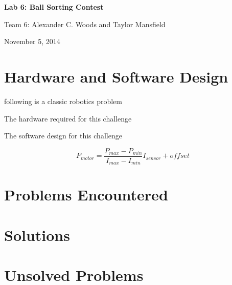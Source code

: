 \documentclass[journal]{../IEEEtran}
\begin{document}
\begin{titlepage}
    \vspace*{\fill}
    \begin{center}
      {\LARGE \bf Lab 6: Ball Sorting Contest}

      {Team 6: Alexander  C. Woods and Taylor Mansfield}

      November 5, 2014
    \end{center}
    \vspace*{\fill}
  \end{titlepage}


\section{Hardware and Software Design}\label{S.design}
 following is a classic robotics problem


The hardware required for this challenge

The software design for this challenge 

\begin{equation}\label{E.motor_speed}
    P_{motor} = \frac{P_{max}-P_{min}}{I_{max}-I_{min}}I_{sensor} + offset
\end{equation}

\section{Problems Encountered}\label{S.problems}


\section{Solutions}\label{S.solutions}


\section{Unsolved Problems}\label{S.unsolved}
\end{document}
